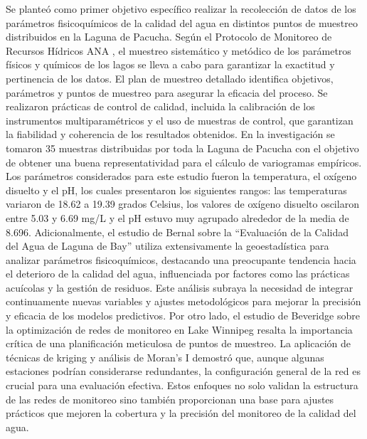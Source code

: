 Se planteó como primer objetivo específico realizar la recolección de datos de los parámetros fisicoquímicos de la calidad del agua en distintos puntos de muestreo distribuidos en la Laguna de Pacucha. Según el Protocolo de Monitoreo de Recursos Hídricos ANA \cite{ana_protocolo_2023}, el muestreo sistemático y metódico de los parámetros físicos y químicos de los lagos se lleva a cabo para garantizar la exactitud y pertinencia de los datos. El plan de muestreo detallado identifica objetivos, parámetros y puntos de muestreo para asegurar la eficacia del proceso. Se realizaron prácticas de control de calidad, incluida la calibración de los instrumentos multiparamétricos y el uso de muestras de control, que garantizan la fiabilidad y coherencia de los resultados obtenidos. En la investigación se tomaron 35 muestras distribuidas por toda la Laguna de Pacucha con el objetivo de obtener una buena representatividad para el cálculo de variogramas empíricos. Los parámetros considerados para este estudio fueron la temperatura, el oxígeno disuelto y el pH, los cuales presentaron los siguientes rangos: las temperaturas variaron de 18.62 a 19.39 grados Celsius, los valores de oxígeno disuelto oscilaron entre 5.03 y 6.69 mg/L y el pH estuvo muy agrupado alrededor de la media de 8.696. Adicionalmente, el estudio de Bernal \cite{Bernal2022} sobre la “Evaluación de la Calidad del Agua de Laguna de Bay” utiliza extensivamente la geoestadística para analizar parámetros fisicoquímicos, destacando una preocupante tendencia hacia el deterioro de la calidad del agua, influenciada por factores como las prácticas acuícolas y la gestión de residuos. Este análisis subraya la necesidad de integrar continuamente nuevas variables y ajustes metodológicos para mejorar la precisión y eficacia de los modelos predictivos. Por otro lado, el estudio de Beveridge \cite{Beveridge2012} sobre la optimización de redes de monitoreo en Lake Winnipeg resalta la importancia crítica de una planificación meticulosa de puntos de muestreo. La aplicación de técnicas de kriging y análisis de Moran’s I demostró que, aunque algunas estaciones podrían considerarse redundantes, la configuración general de la red es crucial para una evaluación efectiva. Estos enfoques no solo validan la estructura de las redes de monitoreo sino también proporcionan una base para ajustes prácticos que mejoren la cobertura y la precisión del monitoreo de la calidad del agua.

